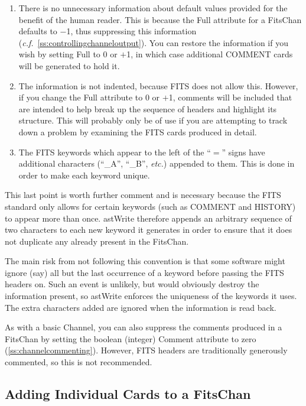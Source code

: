 \documentclass[twoside,11pt]{article}
\newcommand{\htmlref}[2]{#1}
\newcommand{\secref}[1]{\S\ref{#1}}
\renewcommand{\secref}[1]{\ref{#1}}
\begin{document}
\begin{enumerate}
\item There is no unnecessary information about default values
provided for the benefit of the human reader. This is because the \htmlref{Full}{Full}
attribute for a \htmlref{FitsChan}{FitsChan} defaults to $-$1, thus suppressing this
information ({\em{c.f.}}~\secref{ss:controllingchanneloutput}). You
can restore the information if you wish by setting Full to 0 or $+$1,
in which case additional COMMENT cards will be generated to hold it.

\item The information is not indented, because FITS does not allow
this. However, if you change the Full attribute to 0 or $+$1, comments
will be included that are intended to help break up the sequence of
headers and highlight its structure. This will probably only be of use
if you are attempting to track down a problem by examining the FITS
cards produced in detail.

\item The FITS keywords which appear to the left of the ``$=$'' signs
have additional characters (``\_A'', ``\_B'', {\em{etc.}}) appended to
them. This is done in order to make each keyword unique.
\end{enumerate}

This last point is worth further comment and is necessary because the
FITS standard only allows for certain keywords (such as COMMENT and
HISTORY) to appear more than once. \htmlref{astWrite}{astWrite} therefore appends an
arbitrary sequence of two characters to each new keyword it generates
in order to ensure that it does not duplicate any already present in
the FitsChan.

The main risk from not following this convention is that some software
might ignore (say) all but the last occurrence of a keyword before
passing the FITS headers on. Such an event is unlikely, but would
obviously destroy the information present, so astWrite enforces the
uniqueness of the keywords it uses. The extra characters added are
ignored when the information is read back.

As with a basic Channel, you can also suppress the comments produced
in a FitsChan by setting the boolean (integer) \htmlref{Comment}{Comment} attribute to
zero (\secref{ss:channelcommenting}). However, FITS headers are
traditionally generously commented, so this is not recommended.

\subsection{\label{ss:addingfitscards}Adding Individual Cards to a FitsChan}
\end{document}
